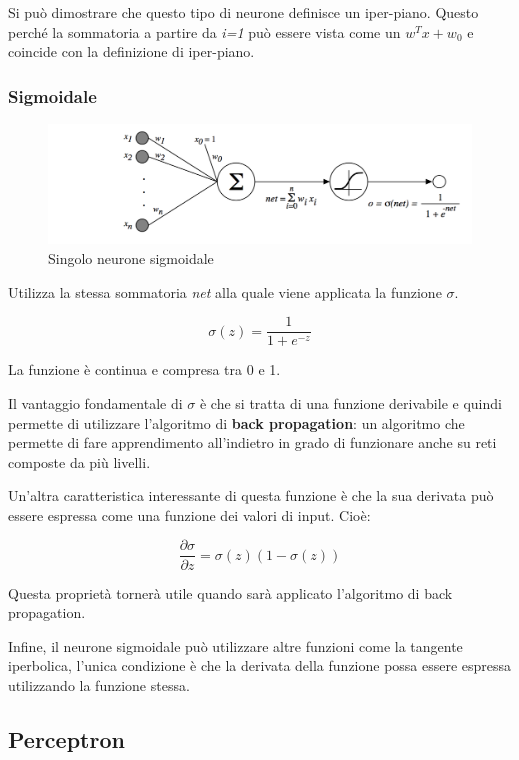 Si può dimostrare che questo tipo di neurone definisce un iper-piano.
Questo perché la sommatoria a partire da \emph{i=1} può essere vista
come un $w^Tx + w_0$ e coincide con la definizione di iper-piano.

\subsubsection{Sigmoidale}\label{sigmoidale}

\begin{figure}[htbp]
\centering
\includegraphics[width=\textwidth]{./notes/immagini/l9-sigmoidale.png}
\caption{Singolo neurone sigmoidale}
\end{figure}

Utilizza la stessa sommatoria \emph{net} alla quale viene applicata la
funzione $\sigma$.

$$
\sigma(z) = \frac{1}{1 + e^{-z}}
$$

La funzione è continua e compresa tra 0 e 1.

Il vantaggio fondamentale di $\sigma$ è che si tratta di una funzione
derivabile e quindi permette di utilizzare l'algoritmo di \textbf{back
propagation}: un algoritmo che permette di fare apprendimento
all'indietro in grado di funzionare anche su reti composte da più
livelli.

Un'altra caratteristica interessante di questa funzione è che la sua
derivata può essere espressa come una funzione dei valori di input.
Cioè:

$$
\frac{\partial \sigma}{\partial z} = \sigma(z)(1-\sigma(z))
$$

Questa proprietà tornerà utile quando sarà applicato l'algoritmo di back
propagation.

Infine, il neurone sigmoidale può utilizzare altre funzioni come la tangente iperbolica, l'unica condizione
è che la derivata della funzione possa essere espressa utilizzando la funzione stessa.

\subsection{Perceptron}\label{perceptron}

